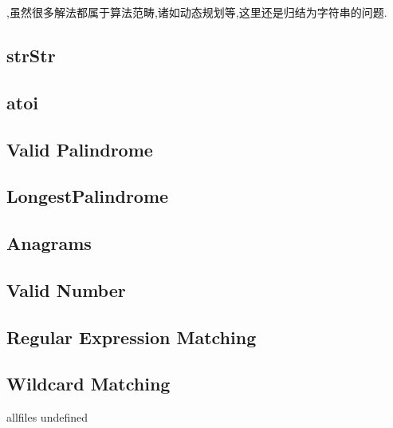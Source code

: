 \documentclass{article}
\begin{document}
\begin{CJK}{UTF8}{gbsn}     %

\else
    
,虽然很多解法都属于算法范畴,诸如动态规划等,这里还是归结为字符串的问题.

\subsection{strStr}

\subsection{atoi}

\subsection{Valid Palindrome}

\subsection{LongestPalindrome}

\subsection{Anagrams}

\subsection{Valid Number}

\subsection{Regular Expression Matching}

\subsection{Wildcard Matching}


\fi

\ifx allfiles undefined
\end{CJK}
\end{document}

